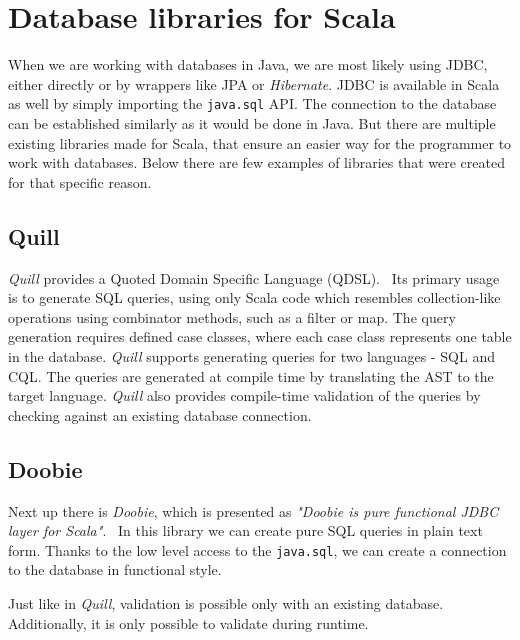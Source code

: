 \section{Database libraries for Scala}
When we are working with databases in Java, we are most likely using JDBC, either directly or by wrappers like JPA or \textit{Hibernate}. JDBC is available in Scala as well by simply importing the \texttt{java.sql} API. The connection to the database can be established similarly as it would be done in Java. But there are multiple existing libraries made for Scala, that ensure an easier way for the programmer to work with databases. Below there are few examples of libraries that were created for that specific reason.

\subsection{Quill}
\textit{Quill} provides a Quoted Domain Specific Language (QDSL).~\cite{Quill} Its primary usage is to generate SQL queries, using only Scala code which resembles collection-like operations using combinator methods, such as a filter or map. The query generation requires defined case classes, where each case class represents one table in the database. \textit{Quill} supports generating queries for two languages - SQL and CQL. The queries are generated at compile time by translating the AST to the target language. \textit{Quill} also provides compile-time validation of the queries by checking against an existing database connection.

\subsection{Doobie}
Next up there is \textit{Doobie}, which is presented as \textit{"Doobie is pure functional JDBC layer for Scala"}.~\cite{Doobie} In this library we can create pure SQL queries in plain text form. Thanks to the low level access to the \texttt{java.sql}, we can create a connection to the database in functional style. 

Just like in \textit{Quill}, validation is possible only with an existing database. Additionally, it is only possible to validate during runtime.

